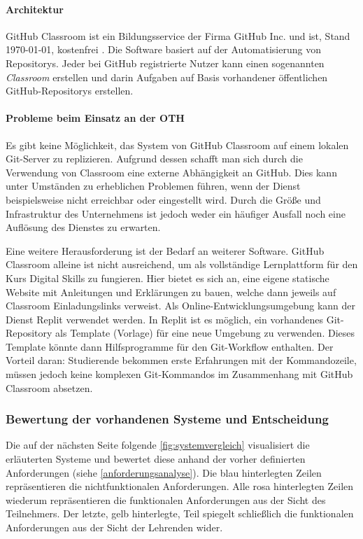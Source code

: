 \paragraph{Architektur}
GitHub Classroom ist ein Bildungsservice der Firma GitHub Inc. und ist, Stand
\today, kostenfrei \parencite{github-classroom-kostenlos}. Die Software basiert
auf der Automatisierung von Repositorys. Jeder bei GitHub registrierte Nutzer
kann einen sogenannten \emph{Classroom} erstellen und darin Aufgaben auf
Basis vorhandener öffentlichen GitHub-Repositorys erstellen.

\paragraph{Probleme beim Einsatz an der OTH}\label{classroom-probleme}
Es gibt keine Möglichkeit, das System von GitHub Classroom auf einem lokalen
Git-Server zu replizieren. Aufgrund dessen schafft man sich durch die
Verwendung von Classroom eine externe Abhängigkeit an GitHub. Dies kann unter
Umständen zu erheblichen Problemen führen, wenn der Dienst beispielsweise
nicht erreichbar oder eingestellt wird. Durch die Größe und Infrastruktur des
Unternehmens ist jedoch weder ein häufiger Ausfall noch eine Auflösung des
Dienstes zu erwarten.

Eine weitere Herausforderung ist der Bedarf an weiterer Software. GitHub
Classroom alleine ist nicht ausreichend, um als vollständige Lernplattform für
den Kurs Digital Skills zu fungieren. Hier bietet es sich an, eine eigene
statische Website mit Anleitungen und Erklärungen zu bauen, welche dann jeweils
auf Classroom Einladungslinks verweist. Als Online-Entwicklungsumgebung kann der
Dienst Replit verwendet werden. In Replit ist es möglich, ein vorhandenes
Git-Repository als Template (Vorlage) für eine neue Umgebung zu verwenden.
Dieses Template könnte dann Hilfsprogramme für den Git-Workflow enthalten. Der
Vorteil daran: Studierende bekommen erste Erfahrungen mit der Kommandozeile,
müssen jedoch keine komplexen Git-Kommandos im Zusammenhang mit GitHub Classroom
absetzen.

\subsubsection{Bewertung der vorhandenen Systeme und Entscheidung}
Die auf der nächsten Seite folgende \autoref{fig:systemvergleich} visualisiert
die erläuterten Systeme und bewertet diese anhand der vorher definierten
Anforderungen (siehe \autoref{anforderungsanalyse}). Die blau hinterlegten
Zeilen repräsentieren die nichtfunktionalen Anforderungen. Alle rosa
hinterlegten Zeilen wiederum repräsentieren die funktionalen Anforderungen aus
der Sicht des Teilnehmers. Der letzte, gelb hinterlegte, Teil spiegelt
schließlich die funktionalen Anforderungen aus der Sicht der Lehrenden wider.

